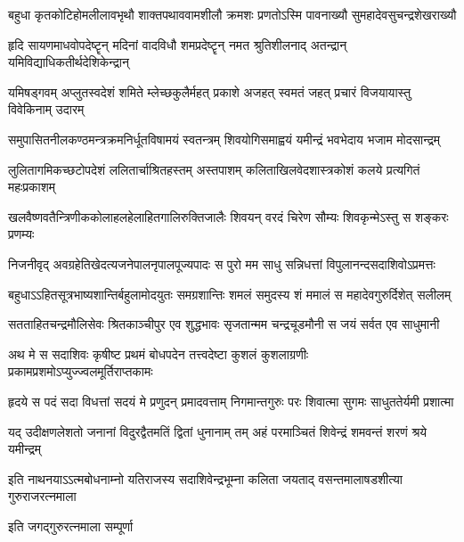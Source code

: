 \twolineshloka
{बहुधा कृतकोटिहोमलीलावभृथौ शाक्तपथाववामशीलौ}
{क्रमशः प्रणतोऽस्मि पावनाख्यौ सुमहादेवसुचन्द्रशेखराख्यौ}%

\twolineshloka
{हृदि सायणमाधवोपदेष्टॄन् मदिनां वादविधौ शमप्रदेष्टॄन्}
{नमत श्रुतिशीलनाद् अतन्द्रान् यमिविद्याधिकतीर्थदेशिकेन्द्रान्}%

\twolineshloka
{यमिषड्गवम् अप्लुतस्वदेशं शमिते म्लेच्छकुलैर्महत् प्रकाशे}
{अजहत् स्वमतं जहत् प्रचारं विजयायास्तु विवेकिनाम् उदारम्}%

\twolineshloka
{समुपासितनीलकण्ठमन्त्रक्रमनिर्धूतविषामयं स्वतन्त्रम्}
{शिवयोगिसमाह्वयं यमीन्द्रं भवभेदाय भजाम मोदसान्द्रम्}%

\twolineshloka
{लुलितागमिकच्छटोपदेशं ललितार्चाश्रितहस्तम् अस्तपाशम्}
{कलिताखिलवेदशास्त्रकोशं कलये प्रत्यगितं महःप्रकाशम्}%

\twolineshloka
{खलवैष्णवतैन्त्रिणीककोलाहलहेलाहितगालिरुक्तिजालैः}
{शिवयन् वरदं चिरेण सौम्यः शिवकृन्मेऽस्तु स शङ्करः प्रणम्यः}%

\twolineshloka
{निजनीवृद् अवग्रहेतिखेदत्यजनेपालनृपालपूज्यपादः}
{स पुरो मम साधु सन्निधत्तां विपुलानन्दसदाशिवोऽप्रमत्तः}%

\twolineshloka
{बहुधाऽऽहितसूत्रभाष्यशान्तिर्बहुलामोदयुतः समग्रशान्तिः}
{शमलं समुदस्य शं ममालं स महादेवगुरुर्दिशेत् सलीलम्}%

\twolineshloka
{सतताहितचन्द्रमौलिसेवः श्रितकाञ्चीपुर एव शुद्धभावः}
{सृजतान्मम चन्द्रचूडमौनी स जयं सर्वत एव साधुमानी}%

\twolineshloka
{अथ मे स सदाशिवः कृषीष्ट प्रथमं बोधपदेन तत्त्वदेष्टा}
{कुशलं कुशलाग्रणीः प्रकामप्रशमोऽप्युज्ज्वलमूर्तिराप्तकामः}%

\twolineshloka
{हृदये स पदं सदा विधत्तां सदयं मे प्रणुदन् प्रमादवत्ताम्}
{निगमान्तगुरुः परः शिवात्मा सुगमः साधुततेर्यमी प्रशात्मा}%

\twolineshloka
{यद् उदीक्षणलेशतो जनानां विदुरद्वैतमतिं द्वितां धुनानाम्}
{तम् अहं परमाञ्चितं शिवेन्द्रं शमवन्तं शरणं श्रये यमीन्द्रम्}%

\twolineshloka
{इति नाथनयाऽऽत्मबोधनाम्नो यतिराजस्य सदाशिवेन्द्रभूम्ना}
{कलिता जयताद् वसन्तमालाषडशीत्या गुरुराजरत्नमाला}%

{इति जगद्गुरुरत्नमाला सम्पूर्णा}

